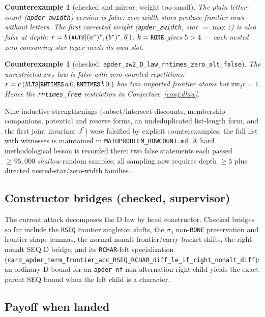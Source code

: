 \documentclass[11pt]{article}
\newtheorem{counterexample}[theorem]{Counterexample}
\newcommand{\zw}{\mathrm{zw}}
\newcommand{\code}[1]{\texttt{\small #1}}
\begin{document}
\begin{counterexample}[checked and mirror; weight too small]
The plain letter-count (\code{apder\_awidth}) version is false:
zero-width stars produce frontier rows without letters.
The first corrected weight (\code{apder\_zwidth}, star $=\max 1$) is
\emph{also} false at depth:
$r = b\,(\code{ALTS}[(a^{*})^{*}, (b^{*})^{*}, b])$, $k=\code{RONE}$ gives
$5 > 4$ --- each nested zero-consuming star layer needs its own slot.
\end{counterexample}

\begin{counterexample}[checked: \code{apder\_zw2\_D\_law\_rntimes\_zero\_alt\_false}]
The unrestricted $\zw_2$ law is false with zero counted repetitions:
$r = c\,(\code{ALTS}[\code{RNTIMES}\,a\,0, \code{RNTIMES}\,b\,0])$ has
two imported frontier atoms but $\zw_2 r = 1$.  Hence the
\code{rntimes\_free} restriction in Conjecture~\ref{conj:dlaw}.
\end{counterexample}

Nine inductive strengthenings (subset/intersect discounts, membership
companions, potential and reserve forms, an undeduplicated list-length form,
and the first joint invariant $J^*$) were falsified by explicit
counterexamples; the full list with witnesses is maintained in
\code{MATHPROBLEM\_ROWCOUNT.md}.  A hard methodological lesson is recorded
there: two false statements each passed $\ge 95{,}000$ \emph{shallow} random
samples; all sampling now requires depth $\ge 5$ plus directed
nested-star/zero-width families.

\subsection{Constructor bridges (checked, supervisor)}

The current attack decomposes the D law by head constructor.  Checked
bridges so far include the \code{RSEQ} frontier singleton shifts, the
$\sigma_4$ non-\code{RONE} preservation and frontier-shape lemmas, the
normal-nonalt frontier/carry-bucket shifts, the right-nonalt SEQ
D bridge, and its \code{RCHAR}-left specialization
(\code{card\_apder\_term\_frontier\_acc\_RSEQ\_RCHAR\_diff\_le\_if\_right\_nonalt\_diff}):
an ordinary D bound for an \code{apder\_nf} non-alternation right child
yields the exact parent SEQ bound when the left child is a character.

\subsection{Payoff when landed}
\end{document}

